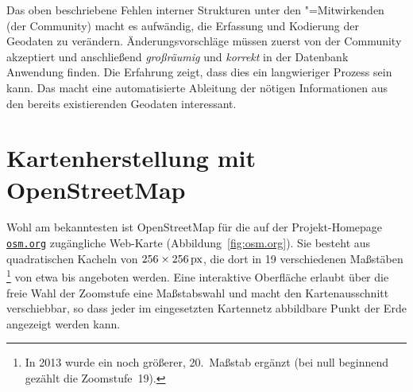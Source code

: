 \documentclass[../main/thesis.tex]{subfiles}
\begin{document}
Das oben beschriebene Fehlen interner Strukturen unter den \osm"=Mitwirkenden (der Community) macht es aufwändig, die Erfassung und Kodierung der Geodaten zu verändern. 
Änderungsvorschläge müssen zuerst von der Community akzeptiert und anschließend \emph{großräumig} und \emph{korrekt} in der Datenbank Anwendung finden.
Die Erfahrung zeigt, dass dies ein langwieriger Prozess sein kann.
Das macht eine automatisierte Ableitung der nötigen Informationen aus den bereits existierenden Geodaten interessant.



\section{Kartenherstellung mit OpenStreetMap} \label{kartenherstellung}

Wohl am bekanntesten ist OpenStreetMap für die auf der Projekt-Homepage \href{https://www.openstreetmap.org/}{\nolinkurl{osm.org}} zugängliche Web-Karte (Abbildung~\ref{fig:osm.org}).
Sie besteht aus quadratischen Kacheln  von $256\times\unit[256]{px}$, die dort in 19 verschiedenen Maßstäben%
\footnote{In 2013 wurde ein noch größerer, 20.~Maßstab ergänzt (bei null beginnend gezählt  die Zoomstufe~19).}
von etwa  bis  angeboten werden. 
Eine interaktive Oberfläche erlaubt über die freie Wahl der Zoomstufe eine Maßstabswahl und macht den Kartenausschnitt verschiebbar, so dass jeder im eingesetzten Kartennetz abbildbare Punkt der Erde angezeigt werden kann.

\end{document}
